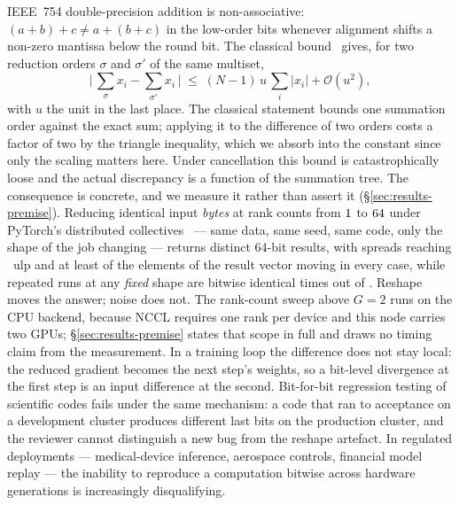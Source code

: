 \documentclass[journal,10pt]{IEEEtran}
\theoremstyle{plain}
\theoremstyle{definition}
\theoremstyle{remark}
\begin{document}
IEEE~754 double-precision addition is non-associative:
$(a+b)+c \neq a+(b+c)$ in the low-order bits whenever alignment shifts a
non-zero mantissa below the round bit. The classical bound~\cite{higham2002accuracy}
gives, for two reduction orders $\sigma$ and $\sigma'$ of the same multiset,
\begin{equation}
  \bigl|\,{\textstyle\sum_\sigma x_i} - {\textstyle\sum_{\sigma'} x_i}\,\bigr|
  \;\leq\; (N-1)\,u\,{\textstyle\sum_i} |x_i| + \mathcal{O}(u^2),
  \label{eq:higham}
\end{equation}
with $u$ the unit in the last place. The classical statement bounds one
summation order against the exact sum; applying it to the difference of two
orders costs a factor of two by the triangle inequality, which we absorb into
the constant since only the scaling matters here. Under cancellation this
bound is catastrophically loose and the actual discrepancy is a function of the
summation tree. The consequence is concrete, and we measure it rather than
assert it (\S\ref{sec:results-premise}). Reducing identical input
\emph{bytes} at \GpuWorldSizes{} rank counts from $1$ to
$64$ under PyTorch's distributed
collectives~\cite{li2020pytorch} --- same data, same seed, same code, only the
shape of the job changing --- returns \GpuRootsDistinct{} distinct 64-bit
results, with spreads reaching \GpuUlpMax{}~ulp and at least
\GpuElemsMovedMin{} of the \GpuElemsTotal{} elements of the result vector
moving in every case, while repeated runs at any \emph{fixed} shape are
bitwise identical \GpuRepeats{} times out of \GpuRepeats{}. Reshape moves the
answer; noise does not. The rank-count sweep above $G{=}2$ runs on the CPU
backend, because NCCL requires one rank per device and this node carries two
GPUs; \S\ref{sec:results-premise} states that scope in full and draws no
timing claim from the measurement. In a training loop the difference does not
stay local: the reduced gradient becomes the next step's weights, so a
bit-level divergence at the first step is an input difference at the second.
Bit-for-bit regression testing of scientific
codes fails under the same mechanism: a code that ran to acceptance on a
development cluster produces different last bits on the production cluster,
and the reviewer cannot distinguish a new bug from the reshape artefact. In
regulated deployments --- medical-device inference, aerospace controls,
financial model replay --- the inability to reproduce a computation bitwise
across hardware generations is increasingly disqualifying.
\end{document}
